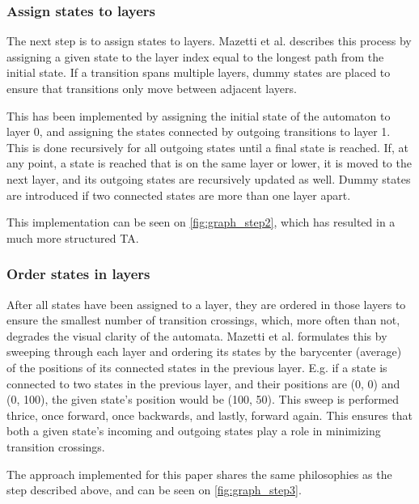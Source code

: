 

\subsubsection{Assign states to layers}
The next step is to assign states to layers. Mazetti et al. describes this process by assigning a given state to the layer index equal to the longest path from the initial state. If a transition spans multiple layers, dummy states are placed to ensure that transitions only move between adjacent layers. \cite{Mazetti2012}

This has been implemented by assigning the initial state of the automaton to layer 0, and assigning the states connected by outgoing transitions to layer 1.
This is done recursively for all outgoing states until a final state is reached.
If, at any point, a state is reached that is on the same layer or lower, it is moved to the next layer, and its outgoing states are recursively updated as well.
Dummy states are introduced if two connected states are more than one layer apart.

This implementation can be seen on \cref{fig:graph_step2}, which has resulted in a much more structured TA.



\subsubsection{Order states in layers}
After all states have been assigned to a layer, they are ordered in those layers to ensure the smallest number of transition crossings, which, more often than not, degrades the visual clarity of the automata.
Mazetti et al. formulates this by sweeping through each layer and ordering its states by the barycenter (average) of the positions of its connected states in the previous layer.
E.g. if a state is connected to two states in the previous layer, and their positions are (0, 0) and (0, 100), the given state's position would be (100, 50).
This sweep is performed thrice, once forward, once backwards, and lastly, forward again.
This ensures that both a given state's incoming and outgoing states play a role in minimizing transition crossings. \cite{Mazetti2012}

The approach implemented for this paper shares the same philosophies as the step described above, and can be seen on \cref{fig:graph_step3}.

